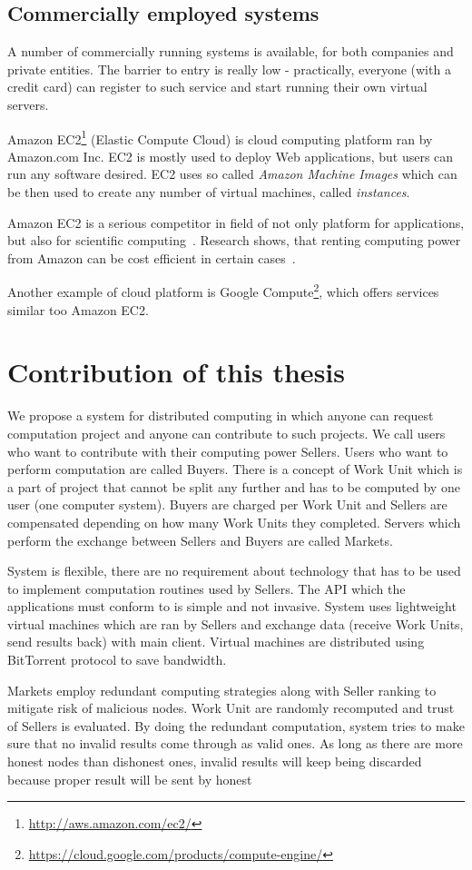 \subsection{Commercially employed systems}
\label{s:comercial_sys}

A number of commercially running systems is available, for both companies and private entities. The barrier to entry is really low - practically, everyone (with a credit card) can register to such service and start running their own virtual servers.

Amazon EC2\footnote{\url{http://aws.amazon.com/ec2/}} (Elastic Compute Cloud) is cloud computing platform ran by Amazon.com Inc. EC2 is mostly used to deploy Web applications, but users can run any software desired. EC2 uses so called \emph{Amazon Machine Images} which can be then used to create any number of virtual machines, called \emph{instances}.

Amazon EC2 is a serious competitor in field of not only platform for applications, but also for scientific computing~\cite{walker2008benchmarking}. Research shows, that renting computing power from Amazon can be cost efficient in certain cases~\cite{berriman2013application}.

Another example of cloud platform is Google Compute\footnote{\url{https://cloud.google.com/products/compute-engine/}}, which offers services similar too Amazon EC2.

\section{Contribution of this thesis}

We propose a system for distributed computing in which anyone can request computation project and anyone can contribute to such projects. We call users who want to contribute with their computing power Sellers. Users who want to perform computation are called Buyers. There is a concept of Work Unit which is a part of project that cannot be split any further and has to be computed by one user (one computer system). Buyers are charged per Work Unit and Sellers are compensated depending on how many Work Units they completed. Servers which perform the exchange between Sellers and Buyers are called Markets.

System is flexible, there are no requirement about technology that has to be used to implement computation routines used by Sellers. The API which the applications must conform to is simple and not invasive. System uses lightweight virtual machines which are ran by Sellers and exchange data (receive Work Units, send results back) with main client. Virtual machines are distributed using BitTorrent protocol to save bandwidth.

Markets employ redundant computing strategies along with Seller ranking to mitigate risk of malicious nodes. Work Unit are randomly recomputed and trust of Sellers is evaluated. By doing the redundant computation, system tries to make sure that no invalid results come through as valid ones. As long as there are more honest nodes than dishonest ones, invalid results will keep being discarded because proper result will be sent by honest
